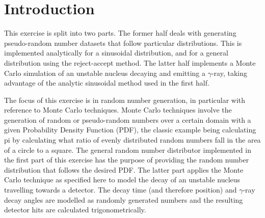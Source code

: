 \section{Introduction}
\label{sec:introduction}

This exercise is split into two parts. The former half deals with generating pseudo-random number datasets that follow particular distributions. This is implemented analytically for a sinusoidal distribution, and for a general distribution using the reject-accept method. The latter half implements a Monte Carlo simulation of an unstable nucleus decaying and emitting a $\gamma$-ray, taking advantage of the analytic sinusoidal method used in the first half.

The focus of this exercise is in random number generation, in particular with reference to Monte Carlo techniques. Monte Carlo techniques involve the generation of random or pseudo-random numbers over a certain domain with a given Probability Density Function (PDF), the classic example being calculating pi by calculating what ratio of evenly distributed random numbers fall in the area of a circle to a square\cite{Mathews04}. The general random number distributor implemented in the first part of this exercise has the purpose of providing the random number distribution that follows the desired PDF. The latter part applies the Monte Carlo technique as specified here to model the decay of an unstable nucleus travelling towards a detector. The decay time (and therefore position) and $\gamma$-ray decay angles are modelled as randomly generated numbers and the resulting detector hits are calculated trigonometrically.
